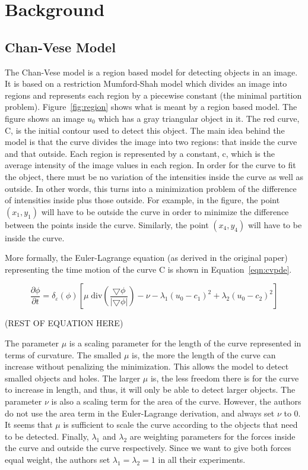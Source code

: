 \documentclass[10pt,journal,letterpaper,compsoc]{IEEEtran}
\begin{document}
\section{Background}
\label{sec:bg}

\subsection{Chan-Vese Model}
\label{sec:chan-vese}

The Chan-Vese model is a region based model for detecting objects in an image. It is based on a restriction Mumford-Shah model which divides an image into
regions and represents each region by a piecewise constant (the minimal partition problem). Figure~\ref{fig:region} shows what is meant by a region based
model. The figure shows an image $u_{0}$ which has a gray triangular object in it. The red curve, C, is the initial contour used to detect this object. The
main idea behind the model is that the curve divides the image into two regions: that inside the curve and that outside. Each region is represented by a
constant, c, which is the average intensity of the image values in each region. In order for the curve to fit the object, there must be no variation of the
intensities inside the curve as well as outside. In other words, this turns into a minimization problem of the difference of intensities inside plus those
outside. For example, in the figure, the point $(x_{1},y_{1})$ will have to be outside the curve in order to minimize the difference between the points inside
the curve. Similarly, the point $(x_{4}, y_{4})$ will have to be inside the curve.

More formally, the Euler-Lagrange equation (as derived in the original paper) representing the time motion of the curve C is shown in Equation~\ref{eqn:cvpde}.

\begin{equation}
\label{eqn:cvpde}
\frac{\partial{\phi}}{\partial{t}} = \delta_{\varepsilon}(\phi)[\mu\; \mathrm{div}(\frac{\bigtriangledown \phi}{|\bigtriangledown \phi|}) - \nu -
\lambda_{1}(u_{0} - c_{1})^2 +\lambda_{2}(u_{0} - c_{2})^2] 
\end{equation}

(REST OF EQUATION HERE)

The parameter $\mu$ is a scaling parameter for the length of the curve represented in terms of curvature. The smalled $\mu$ is, the more the length of the curve
can increase without penalizing the minimization. This allows the model to detect smalled objects and holes. The larger $\mu$ is, the less freedom there is for
the curve to increase in length, and thus, it will only be able to detect larger objects. The parameter $\nu$ is also a scaling term for the area of the curve.
However, the authors do not use the area term in the Euler-Lagrange derivation, and always set $\nu$ to 0. It seems that $\mu$ is sufficient to scale the curve
according to the objects that need to be detected. Finally, $\lambda_{1}$ and $\lambda_{2}$ are weighting parameters for the forces inside the curve and
outside the curve respectively. Since we want to give both forces equal weight, the authors set $\lambda_{1} = \lambda_{2} = 1$ in all their experiments.
\end{document}
